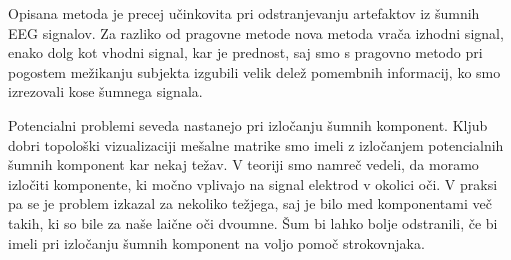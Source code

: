 \documentclass[9pt]{IEEEtran}
\begin{document}
Opisana metoda je precej učinkovita pri odstranjevanju artefaktov iz šumnih EEG signalov. Za razliko od pragovne metode nova metoda vrača izhodni signal, enako dolg kot vhodni signal, kar je prednost, saj smo s pragovno metodo pri pogostem mežikanju subjekta izgubili velik delež pomembnih informacij, ko smo izrezovali kose šumnega signala.

Potencialni problemi seveda nastanejo pri izločanju šumnih komponent. Kljub dobri topološki vizualizaciji mešalne matrike smo imeli z izločanjem potencialnih šumnih komponent kar nekaj težav. V teoriji smo namreč vedeli, da moramo izločiti komponente, ki močno vplivajo na signal elektrod v okolici oči. V praksi pa se je problem izkazal za nekoliko težjega, saj je bilo med komponentami več takih, ki so bile za naše laične oči dvoumne. Šum bi lahko bolje odstranili, če bi imeli pri izločanju šumnih komponent na voljo pomoč strokovnjaka. 



\end{document}
